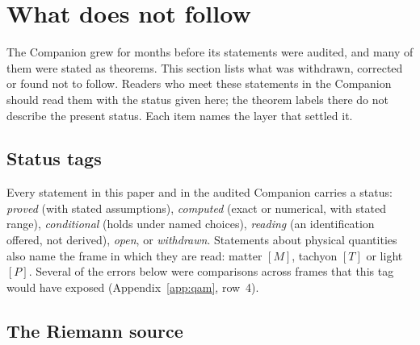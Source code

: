 \section{What does not follow}\label{sec:not}

The Companion grew for months before its statements were audited, and many of them were stated as theorems.  This section lists what
was withdrawn, corrected or found not to follow.  Readers who meet these statements in the Companion should read them with the status
given here; the theorem labels there do not describe the present status.  Each item names the layer that settled it.

\subsection{Status tags}

Every statement in this paper and in the audited Companion carries a status: \emph{proved} (with stated assumptions),
\emph{computed} (exact or numerical, with stated range), \emph{conditional} (holds under named choices), \emph{reading} (an
identification offered, not derived), \emph{open}, or \emph{withdrawn}.  Statements about physical quantities also name the frame in
which they are read: matter \([M]\), tachyon \([T]\) or light \([P]\).  Several of the errors below were comparisons across frames
that this tag would have exposed (Appendix~\ref{app:qam}, row~4).

\subsection{The Riemann source}

